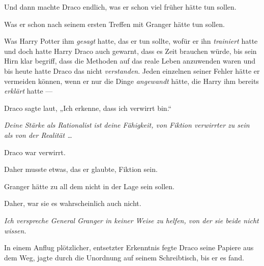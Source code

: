 Und dann machte Draco endlich, was er schon viel früher hätte tun sollen.

Was er schon nach seinem ersten Treffen mit Granger hätte tun sollen.

Was Harry Potter ihm \emph{gesagt} hatte, das er tun sollte, wofür er ihn \emph{trainiert} hatte und doch hatte Harry Draco auch gewarnt, dass es Zeit brauchen würde, bis sein Hirn klar begriff, dass die Methoden auf das reale Leben anzuwenden waren und bis heute hatte Draco das nicht \emph{verstanden}. Jeden einzelnen seiner Fehler hätte er vermeiden können, wenn er nur die Dinge \emph{angewandt} hätte, die Harry ihm bereits \emph{erklärt} hatte —

Draco sagte laut,
„Ich erkenne, dass ich verwirrt bin.“

\emph{Deine Stärke als Rationalist ist deine Fähigkeit, von Fiktion verwirrter zu sein als von der Realität …}

Draco war verwirrt.

Daher musste etwas, das er glaubte, Fiktion sein.

Granger hätte zu all dem nicht in der Lage sein sollen.

Daher, war sie es wahrscheinlich auch nicht.

\emph{Ich verspreche General Granger in keiner Weise zu helfen, von der sie beide nicht wissen.}

In einem Anflug plötzlicher, entsetzter Erkenntnis fegte Draco seine Papiere aus dem Weg, jagte durch die Unordnung auf seinem Schreibtisch, bis er es fand.

